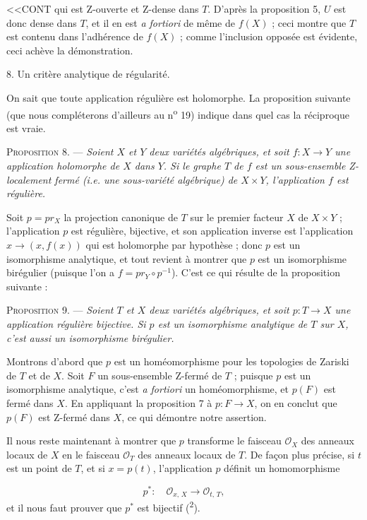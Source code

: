
<<CONT qui est Z-ouverte et Z-dense dans $T$. D'après la proposition 5, $U$ est donc dense dans $T$, et il en est \textit{a fortiori} de même de $f(X)$ ; ceci montre que $T$ est contenu dans l'adhérence de $f(X)$ ; comme l'inclusion opposée est évidente, ceci achève la démonstration.


8. Un critère analytique de régularité.

On sait que toute application régulière est holomorphe. La proposition suivante (que nous compléterons d'ailleurs au n\textsuperscript{o} 19) indique dans quel cas la réciproque est vraie.

\textsc{Proposition} 8. --- \textit{Soient $X$ et $Y$ deux variétés algébriques, et soit $f : X \to Y$ une application holomorphe de $X$ dans $Y$. Si le graphe $T$ de $f$ est un sous-ensemble Z-localement fermé (i.e. une sous-variété algébrique) de $X \times Y$, l'application $f$ est régulière.}

Soit $p = pr_X$ la projection canonique de $T$ sur le premier facteur $X$ de $X \times Y$ ; l'application $p$ est régulière, bijective, et son application inverse est l'application $x \to (x, f(x))$ qui est holomorphe par hypothèse ; donc $p$ est un isomorphisme analytique, et tout revient à montrer que $p$ est un isomorphisme birégulier (puisque l'on a $f = pr_Y \circ p^{-1}$). C'est ce qui résulte de la proposition suivante :

\textsc{Proposition} 9. --- \textit{Soient $T$ et $X$ deux variétés algébriques, et soit $p : T \to X$ une application régulière bijective. Si $p$ est un isomorphisme analytique de $T$ sur $X$, c'est aussi un isomorphisme birégulier.}

Montrons d'abord que $p$ est un homéomorphisme pour les topologies de Zariski de $T$ et de $X$. Soit $F$ un sous-ensemble Z-fermé de $T$ ; puisque $p$ est un isomorphisme analytique, c'est \textit{a fortiori} un homéomorphisme, et $p(F)$ est fermé dans $X$. En appliquant la proposition 7 à $p : F \to X$, on en conclut que $p(F)$ est Z-fermé dans $X$, ce qui démontre notre assertion.

Il nous reste maintenant à montrer que $p$ transforme le faisceau $\mathcal{O}_X$ des anneaux locaux de $X$ en le faisceau $\mathcal{O}_T$ des anneaux locaux de $T$. De façon plus précise, si $t$ est un point de $T$, et si $x = p(t)$, l'application $p$ définit un homomorphisme

\begin{equation*}
p^* : \quad \mathcal{O}_{x,\, X} \longrightarrow \mathcal{O}_{t,\, T},
\end{equation*}
et il nous faut prouver que $p^*$ est bijectif (\textsuperscript{2}).

